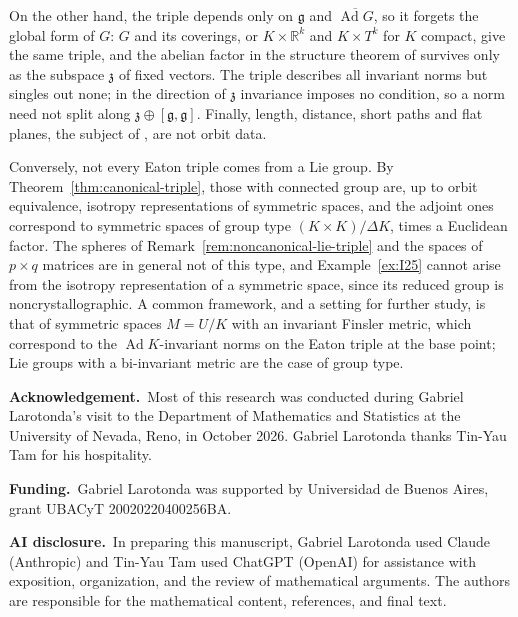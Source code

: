 \documentclass[11pt]{amsart}
\theoremstyle{plain}
\theoremstyle{definition}
\theoremstyle{remark}
\newcommand{\fg}{\mathfrak g}
\newcommand{\R}{\mathbb R}
\newcommand{\Ad}{\operatorname{Ad}}
\begin{document}
On the other hand, the triple depends only on $\fg$ and $\overline{\Ad G}$, so it forgets the global form of $G$: $G$ and its coverings, or $K\times\R^k$ and $K\times T^k$ for $K$ compact, give the same triple, and the abelian factor in the structure theorem of \cite{LR} survives only as the subspace $\mathfrak z$ of fixed vectors. The triple describes all invariant norms but singles out none; in the direction of $\mathfrak z$ invariance imposes no condition, so a norm need not split along $\mathfrak z\oplus[\fg,\fg]$. Finally, length, distance, short paths and flat planes, the subject of \cite{LR}, are not orbit data.

Conversely, not every Eaton triple comes from a Lie group. By Theorem~\ref{thm:canonical-triple}, those with connected group are, up to orbit equivalence, isotropy representations of symmetric spaces, and the adjoint ones correspond to symmetric spaces of group type $(K\times K)/\Delta K$, times a Euclidean factor. The spheres of Remark~\ref{rem:noncanonical-lie-triple} and the spaces of $p\times q$ matrices are in general not of this type, and Example~\ref{ex:I25} cannot arise from the isotropy representation of a symmetric space, since its reduced group is noncrystallographic. A common framework, and a setting for further study, is that of symmetric spaces $M=U/K$ with an invariant Finsler metric, which correspond to the $\Ad K$-invariant norms on the Eaton triple at the base point; Lie groups with a bi-invariant metric are the case of group type.

\par\bigskip
\noindent\textbf{Acknowledgement.}\ 
Most of this research was conducted during Gabriel Larotonda's visit to the Department of Mathematics and Statistics at the University of Nevada, Reno, in October 2026. Gabriel Larotonda thanks Tin-Yau Tam for his hospitality.

\par\bigskip
\noindent\textbf{Funding.}\ 
Gabriel Larotonda was supported by Universidad de Buenos Aires, grant UBACyT 20020220400256BA.

\par\bigskip
\noindent\textbf{AI disclosure.}\ 
In preparing this manuscript, Gabriel Larotonda used Claude (Anthropic) and Tin-Yau Tam used ChatGPT (OpenAI) for assistance with exposition, organization, and the review of mathematical arguments. The authors are responsible for the mathematical content, references, and final text.
\end{document}

